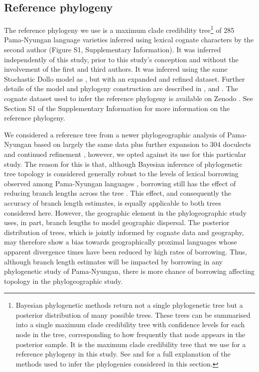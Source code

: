\hypertarget{ref-phylogeny}{%
\subsection{Reference phylogeny}\label{ref-phylogeny}}

The reference phylogeny we use is a maximum clade credibility tree\footnote{Bayesian phylogenetic methods return not a single phylogenetic tree but a posterior distribution of many possible trees. These trees can be summarised into a single maximum clade credibility tree with confidence levels for each node in the tree, corresponding to how frequently that node appears in the posterior sample. It is the maximum clade credibility tree that we use for a reference phylogeny in this study. See \textcite{bowern_computational_2012} and \textcite{bouckaert_origin_2018} for a full explanation of the methods used to infer the phylogenies considered in this section.} of 285 Pama-Nyungan language varieties inferred using lexical cognate characters by the second author (Figure S1, Supplementary Information). It was inferred independently of this study, prior to this study's conception and without the involvement of the first and third authors. It was inferred using the same Stochastic Dollo model as \textcite{bowern_computational_2012}, but with an expanded and refined dataset. Further details of the model and phylogeny construction are described in \textcite{bowern_computational_2012}, \textcite{bowern_pama-nyungan_2015} and \textcite{bouckaert_origin_2018}. The cognate dataset used to infer the reference phylogeny is available on Zenodo \autocite{bowern_pama-nyungan_2018}. See Section S1 of the Supplementary Information for more information on the reference phylogeny.

We considered a reference tree from a newer phylogeographic analysis of Pama-Nyungan based on largely the same data plus further expansion to 304 doculects and continued refinement \autocite{bouckaert_origin_2018}, however, we opted against its use for this particular study. The reason for this is that, although Bayesian inference of phylogenetic tree topology is considered generally robust to the levels of lexical borrowing observed among Pama-Nyungan languages \autocites{greenhill_does_2009}{bowern_does_2011}, borrowing still has the effect of reducing branch lengths across the tree \autocite{greenhill_does_2009}. This effect, and consequently the accuracy of branch length estimates, is equally applicable to both trees considered here. However, the geographic element in the phylogeographic study uses, in part, branch lengths to model geographic dispersal. The posterior distribution of trees, which is jointly informed by cognate data and geography, may therefore show a bias towards geographically proximal languages whose apparent divergence times have been reduced by high rates of borrowing. Thus, although branch length estimates will be impacted by borrowing in any phylogenetic study of Pama-Nyungan, there is more chance of borrowing affecting topology in the phylogeographic study.

